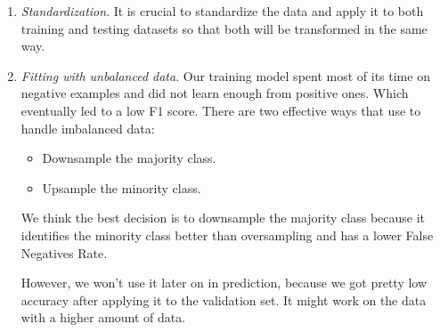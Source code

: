\documentclass[10pt,conference,compsocconf]{IEEEtran}
\begin{document}
\begin{enumerate}

\item {\textit{Standardization}.}
It is crucial to standardize the data and apply it to both training and testing datasets so that both will be transformed in the same way. 


\item {\textit{Fitting with unbalanced data}.}
Our training model spent most of its time on negative examples and did not learn enough from positive ones. Which eventually led to a low F1 score. 
There are two effective ways that use to handle imbalanced data:
\begin{itemize}
    \item {Downsample the majority class.}
    \item {Upsample the minority class.}
\end{itemize}
We think the best decision is to downsample the majority class because it identifies the minority class better than oversampling and has a lower False Negatives Rate.

However, we won't use it later on in prediction, because we got pretty low accuracy after applying it to the validation set. It might work on the data with a higher amount of data.

\end{enumerate}
\end{document}
